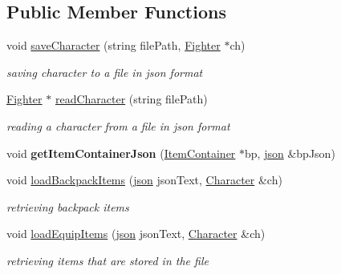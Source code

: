 \subsection*{Public Member Functions}
\begin{DoxyCompactItemize}
\item 
\hypertarget{class_character_file_i_o_a5ca1cec11fa5a2ca3fba5c2ea750bbfd}{}\label{class_character_file_i_o_a5ca1cec11fa5a2ca3fba5c2ea750bbfd} 
void \hyperlink{class_character_file_i_o_a5ca1cec11fa5a2ca3fba5c2ea750bbfd}{save\+Character} (string file\+Path, \hyperlink{class_fighter}{Fighter} $\ast$ch)
\begin{DoxyCompactList}\small\item\em saving character to a file in json format \end{DoxyCompactList}\item 
\hypertarget{class_character_file_i_o_ab0604c23ec564c1edf3dcb99c8702c46}{}\label{class_character_file_i_o_ab0604c23ec564c1edf3dcb99c8702c46} 
\hyperlink{class_fighter}{Fighter} $\ast$ \hyperlink{class_character_file_i_o_ab0604c23ec564c1edf3dcb99c8702c46}{read\+Character} (string file\+Path)
\begin{DoxyCompactList}\small\item\em reading a character from a file in json format \end{DoxyCompactList}\item 
\hypertarget{class_character_file_i_o_a6beab2768db431e6b51d7b03a86c848e}{}\label{class_character_file_i_o_a6beab2768db431e6b51d7b03a86c848e} 
void {\bfseries get\+Item\+Container\+Json} (\hyperlink{class_item_container}{Item\+Container} $\ast$bp, \hyperlink{classnlohmann_1_1basic__json}{json} \&bp\+Json)
\item 
\hypertarget{class_character_file_i_o_a60a2d08545c0e5e1b91caafc90d75eed}{}\label{class_character_file_i_o_a60a2d08545c0e5e1b91caafc90d75eed} 
void \hyperlink{class_character_file_i_o_a60a2d08545c0e5e1b91caafc90d75eed}{load\+Backpack\+Items} (\hyperlink{classnlohmann_1_1basic__json}{json} json\+Text, \hyperlink{class_character}{Character} \&ch)
\begin{DoxyCompactList}\small\item\em retrieving backpack items \end{DoxyCompactList}\item 
\hypertarget{class_character_file_i_o_ad940442fb0da87cdb16a1ddcc7cfda3b}{}\label{class_character_file_i_o_ad940442fb0da87cdb16a1ddcc7cfda3b} 
void \hyperlink{class_character_file_i_o_ad940442fb0da87cdb16a1ddcc7cfda3b}{load\+Equip\+Items} (\hyperlink{classnlohmann_1_1basic__json}{json} json\+Text, \hyperlink{class_character}{Character} \&ch)
\begin{DoxyCompactList}\small\item\em retrieving items that are stored in the file \end{DoxyCompactList}\end{DoxyCompactItemize}



